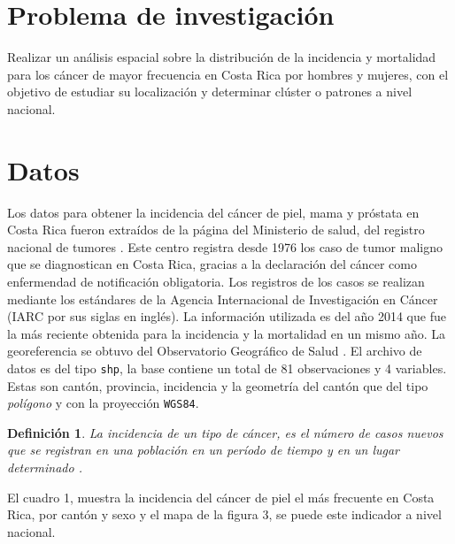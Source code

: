 \documentclass[12pt]{sciposter}
\newtheorem{defi}{Definición}
\begin{document}
\begin{multicols}{2}
\section{Problema de investigación}

Realizar un análisis espacial sobre la distribución de la incidencia y mortalidad para los cáncer de mayor frecuencia en Costa Rica por hombres y mujeres, con el objetivo de estudiar su localización y determinar clúster o patrones a nivel nacional.

\section{Datos}

Los datos para obtener la incidencia del cáncer de piel, mama y próstata en Costa Rica fueron extraídos de la página del Ministerio de salud, del registro nacional de tumores \cite{Salud}. Este centro registra desde 1976 los caso de tumor maligno que se diagnostican en Costa Rica, gracias a la declaración del cáncer como enfermendad de notificación obligatoria. Los registros de los casos se realizan mediante los estándares de la Agencia Internacional de Investigación en Cáncer (IARC por sus siglas en inglés). La información utilizada es del año 2014 que fue la más reciente obtenida para la incidencia y la mortalidad en un mismo año. La georeferencia se obtuvo del Observatorio Geográfico de Salud \cite{OGES}. El archivo de datos es del tipo \verb|shp|, la base contiene un total de 81 observaciones y 4 variables. Estas son cantón, provincia, incidencia y la geometría del cantón que del tipo \textit{polígono} y con la proyección \verb|WGS84|. 
\bigskip

\begin{defi}
La incidencia de un tipo de cáncer, es el número de casos nuevos que se registran en una población en un período de tiempo y en un lugar determinado \cite{OGES}.
\end{defi}
\bigskip

El cuadro 1, muestra la incidencia del cáncer de piel el más frecuente en Costa Rica, por cantón y sexo y el mapa de la figura 3, se puede este indicador a nivel nacional.
\bigskip


\end{multicols}
\end{document}
